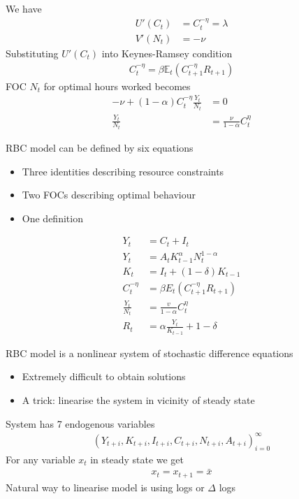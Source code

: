 \documentclass{beamer}
\begin{document}
\begin{frame}
 We have
 \begin{align}
  U'(C_t) &= C_t^{-\eta}=\lambda\\
  V'(N_t) &= -\nu
 \end{align}
  Substituting $U'(C_t)$ into Keynes-Ramsey condition   
\begin{align}
  C^{-\eta}_t=\beta \mathbb{E}_t(C^{-\eta}_{t+1}R_{t+1})
\end{align}
FOC $N_t$ for optimal hours worked becomes
\begin{align}
  -\nu +(1-\alpha)C^{-\eta}_t \frac{Y_t}{N_t} &= 0 \\ \nonumber
  \frac{Y_t}{N_t} &= \frac{\nu}{1-\alpha}C_t^{\eta}
\end{align}
\end{frame}
\begin{frame}
RBC model can be defined by six equations
\begin{itemize}
  \item Three identities describing resource constraints  
  \item Two FOCs describing optimal behaviour
  \item One definition
\end{itemize}
\begin{align}
  Y_t &= C_t +I_t\\
  Y_t &= A_tK^{\alpha}_{t-1}N^{1-\alpha}_t\\
  K_t &= I_t+(1-\delta)K_{t-1}\\
  C^{-\eta}_t &= \beta E_t(C^{-\eta}_{t+1}R_{t+1})\\
  \frac{Y_t}{N_t} &= \frac{v}{1-\alpha}C^{\eta}_t\\
  R_t &= \alpha \frac{Y_t}{K_{t-1}}+1-\delta
\end{align}
\end{frame}

\begin{frame}
  RBC model is a nonlinear system of stochastic difference equations
  \begin{itemize}
     \item Extremely difficult to obtain solutions 
     \item A trick: linearise the system in vicinity of steady state
   \end{itemize} 
   \medskip
  System has 7 endogenous variables
\begin{align*}
     (Y_{t+i},K_{t+i},I_{t+i},C_{t+i},N_{t+i},A_{t+i})_{i=0}^{\infty}
   \end{align*}   
   \medskip
   For any variable $x_t$ in steady state we get
   \begin{align}
     x_t=x_{t+1}=\bar{x}
   \end{align}
   \medskip
   Natural way to linearise model is using logs or $\Delta$ logs
\end{frame}
\end{document}

